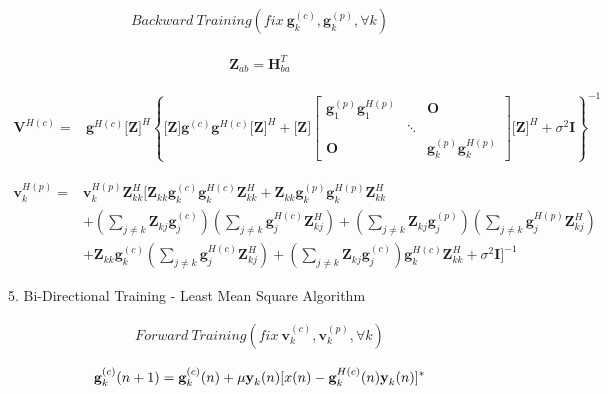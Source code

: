 \documentclass[11pt, oneside]{article}   	%
\begin{document}
\begin{align*}
Backward\ Training (fix\  \textbf{g}^{(c)}_{k}, \textbf{g}^{(p)}_{k}, \forall k)
\end{align*}

\begin{align*}
\textbf{Z}_{ab}=\textbf{H}^{T}_{ba}
\end{align*}

\begin{align*}
\textbf{V}^{H(c)} =  &\textbf{g}^{H(c)}		\textbf{[Z]}^{H} 
\left\{ 
\textbf{[Z]}	\textbf{g}^{(c)}	\textbf{g}^{H(c)}		\textbf{[Z]}^{H}
+\textbf{[Z]}
\begin{bmatrix}
       \textbf{g}^{(p)}_{1}	\textbf{g}^{H(p)}_{1} &  &   \textbf{O}      \\[0.3em]
        & \ddots       & \\[0.3em]
           \textbf{O}        & & \textbf{g}^{(p)}_{k}	\textbf{g}^{H(p)}_{k}
     \end{bmatrix}
    \textbf{[Z]}^{H}
    +\sigma^2	\textbf{I}
\right\}^{-1}	
\end{align*}

\begin{align*}
\textbf{v}^{H(p)}_{k} = &\textbf{v}^{H(p)}_{k}	\textbf{Z}^{H}_{kk} 
[
\textbf{Z}_{kk}	\textbf{g}^{(c)}_{k}	\textbf{g}^{H(c)}_{k}	\textbf{Z}^{H}_{kk}
+\textbf{Z}_{kk}	\textbf{g}^{(p)}_{k}	\textbf{g}^{H(p)}_{k}	\textbf{Z}^{H}_{kk}	\\
&+(\displaystyle\sum_{j \neq k}\textbf{Z}_{kj}\textbf{g}^{(c)}_{j})
(\displaystyle\sum_{j \neq k}\textbf{g}^{H(c)}_{j}\textbf{Z}^{H}_{kj})
+(\displaystyle\sum_{j \neq k}\textbf{Z}_{kj}\textbf{g}^{(p)}_{j})
(\displaystyle\sum_{j \neq k}\textbf{g}^{H(p)}_{j}\textbf{Z}^{H}_{kj})	\\
&+\textbf{Z}_{kk}	\textbf{g}^{(c)}_{k}
(\displaystyle\sum_{j \neq k}\textbf{g}^{H(c)}_{j}\textbf{Z}^{H}_{kj})
+(\displaystyle\sum_{j \neq k}\textbf{Z}_{kj}\textbf{g}^{(c)}_{j})
\textbf{g}^{H(c)}_{k}	\textbf{Z}^{H}_{kk}
+\sigma^2	\textbf{I}
]^{-1}	
\end{align*}

5. Bi-Directional Training - Least Mean Square Algorithm

\begin{align*}
Forward\ Training (fix\  \textbf{v}^{(c)}_{k}, \textbf{v}^{(p)}_{k}, \forall k)
\end{align*}

\begin{align*}
\textbf{g}^{(c)}_{k}(n+1)= \textbf{g}^{(c)}_{k}(n)+ \mu \textbf y_k(n) [x(n)- \textbf{g}^{H(c)}_{k}(n) \textbf y_k(n)]^*
\end{align*}
\end{document}
